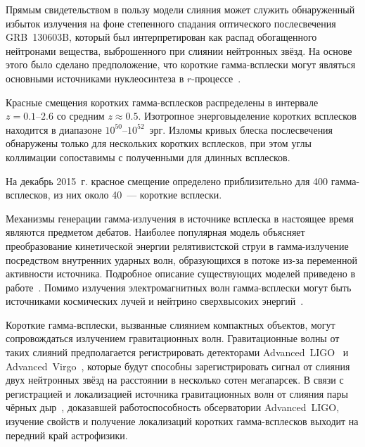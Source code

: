 Прямым свидетельством в пользу модели слияния может служить обнаруженный избыток 
излучения на фоне степенного спадания оптического послесвечения GRB~130603B, 
который был интерпретирован как распад обогащенного нейтронами вещества, 
выброшенного при слиянии нейтронных звёзд. На основе этого было сделано предположение, 
что короткие гамма-всплески могут являться основными источниками нуклеосинтеза в 
$r$-процессе~\citep{Tanvir_2013Natur}.
 
Красные смещения коротких гамма-всплесков распределены в интервале $z=0.1\mbox{--}2.6$ 
со средним $z\approx 0.5$.
Изотропное энерговыделение коротких всплесков находится в диапазоне $10^{50}$--$10^{52}$~эрг.
Изломы кривых блеска послесвечения обнаружены только для нескольких коротких всплесков, 
при этом углы коллимации сопоставимы с полученными для длинных всплесков. 

На декабрь 2015~г. красное смещение определено приблизительно для 400 гамма-всплесков, 
из них около 40~--- короткие всплески. 

Механизмы генерации гамма-излучения в источнике всплеска в настоящее время 
являются предметом дебатов. Наиболее популярная модель объясняет преобразование 
кинетической энергии релятивистской струи в гамма-излучение посредством внутренних
ударных волн, образующихся в потоке из-за переменной активности источника.
Подробное описание существующих моделей приведено в работе~\citep{Kumar_and_Zhang_2014PhR}.
Помимо излучения электромагнитных волн гамма-всплески могут быть источниками
космических лучей и нейтрино сверхвысоких энергий~\citep{Aartsen_2015ApJ,Baerwald_2015APh}.

Короткие гамма-всплески, вызванные слиянием компактных объектов, могут сопровождаться излучением гравитационных волн. 
Гравитационные волны от таких слияний предполагается регистрировать 
детекторами Advanced~LIGO~\citep{LIGO_2015CQGra} и Advanced~Virgo~\citep{Acernese_2015CQGra}, 
которые будут способны зарегистрировать сигнал от слияния
двух нейтронных звёзд на расстоянии в несколько сотен мегапарсек. 
В связи с регистрацией и локализацией источника гравитационных
волн от слияния пары чёрных дыр~\citep{Abbott_2016PhRvL}, доказавшей работоспособность обсерватории 
Advanced~LIGO, изучение свойств и получение локализаций коротких гамма-всплесков 
выходит на передний край астрофизики.

